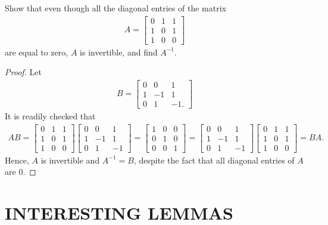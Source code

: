 \documentclass[12pt]{article}
\newenvironment{problem}[2][Problem]{\begin{trivlist} \item[\hskip \labelsep {\bfseries #1}\hskip \labelsep {\bfseries #2.}]}{\end{trivlist}}
\begin{document}
\begin{problem}{1.22}
  Show that even though all the diagonal entries of the matrix
\begin{align*}
A=
\begin{bmatrix}
  0 & 1 & 1\\ 1 & 0 & 1\\ 1 & 0 & 0
\end{bmatrix}
\end{align*}
are equal to zero, $A$ is invertible, and find $A^{-1}$. 
\begin{proof}
  Let 
\begin{align*}
  B=
\begin{bmatrix}
  0 & 0 & 1\\ 1 & -1 & 1\\ 0 & 1 & -1. 
\end{bmatrix}
\end{align*}
It is readily checked that 
\begin{align*}
  AB = 
\begin{bmatrix}
  0 & 1 & 1\\ 1 & 0 & 1\\ 1 & 0 & 0 
\end{bmatrix}
\begin{bmatrix}
  0 & 0 & 1\\ 1 & -1 & 1\\ 0 & 1 & -1 
\end{bmatrix}
= 
\begin{bmatrix}
  1 & 0 & 0\\ 0 & 1 & 0\\ 0 & 0 & 1 
\end{bmatrix}
=
\begin{bmatrix}
  0 & 0 & 1\\ 1 & -1 & 1\\ 0 & 1 & -1 
\end{bmatrix}
\begin{bmatrix}
  0 & 1 & 1\\ 1 & 0 & 1\\ 1 & 0 & 0 
\end{bmatrix}
= BA.
\end{align*}
Hence, $A$ is invertible and $A^{-1}=B$, despite the fact that all diagonal entries of $A$ are $0$. 
\end{proof}
\end{problem}
\section{INTERESTING LEMMAS}
\end{document}
